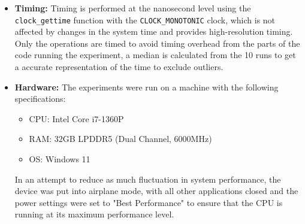 \documentclass{article}
\begin{document}
\begin{itemize}
    \item \textbf{Timing:} Timing is performed at the nanosecond level using the \texttt{clock\_gettime} function with the \texttt{CLOCK\_MONOTONIC} clock, which is not affected by changes in the system time and provides high-resolution timing. Only the operations are timed to avoid timing overhead from the parts of the code running the experiment, a median is calculated from the 10 runs to get a accurate representation of the time to exclude outliers.
    \item \textbf{Hardware:} The experiments were run on a machine with the following specifications: \begin{itemize}
        \item CPU: Intel Core i7-1360P
        \item RAM: 32GB LPDDR5 (Dual Channel, 6000MHz)
        \item OS: Windows 11
    \end{itemize}
    In an attempt to reduce as much fluctuation in system performance, the device was put into airplane mode, with all other applications closed and the power settings were set to "Best Performance" to ensure that the CPU is running at its maximum performance level.
\end{itemize}
\newpage
\end{document}
